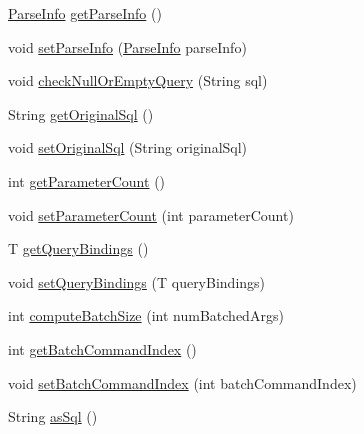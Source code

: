 \begin{DoxyCompactItemize}
\item 
\mbox{\hyperlink{classcom_1_1mysql_1_1cj_1_1_parse_info}{Parse\+Info}} \mbox{\hyperlink{interfacecom_1_1mysql_1_1cj_1_1_prepared_query_a4c05f98057039c47c3866f4113bd2d4e}{get\+Parse\+Info}} ()
\item 
void \mbox{\hyperlink{interfacecom_1_1mysql_1_1cj_1_1_prepared_query_a616abdbbf0bf436a8324917bbef4078d}{set\+Parse\+Info}} (\mbox{\hyperlink{classcom_1_1mysql_1_1cj_1_1_parse_info}{Parse\+Info}} parse\+Info)
\item 
void \mbox{\hyperlink{interfacecom_1_1mysql_1_1cj_1_1_prepared_query_a3d5c1f7649b3caecdfd05e6161d55ee8}{check\+Null\+Or\+Empty\+Query}} (String sql)
\item 
String \mbox{\hyperlink{interfacecom_1_1mysql_1_1cj_1_1_prepared_query_a15a2071e71800462de4e0e82b7e71af2}{get\+Original\+Sql}} ()
\item 
void \mbox{\hyperlink{interfacecom_1_1mysql_1_1cj_1_1_prepared_query_ae44f0bc2ecc43451a553b7681f5e2203}{set\+Original\+Sql}} (String original\+Sql)
\item 
int \mbox{\hyperlink{interfacecom_1_1mysql_1_1cj_1_1_prepared_query_af1cfb6147da91d2a8a661e52be4f6f55}{get\+Parameter\+Count}} ()
\item 
void \mbox{\hyperlink{interfacecom_1_1mysql_1_1cj_1_1_prepared_query_adec66658c5ac61ba9e016651bdfb16a5}{set\+Parameter\+Count}} (int parameter\+Count)
\item 
T \mbox{\hyperlink{interfacecom_1_1mysql_1_1cj_1_1_prepared_query_a437189199c669b86be0b4407e6d44d5d}{get\+Query\+Bindings}} ()
\item 
void \mbox{\hyperlink{interfacecom_1_1mysql_1_1cj_1_1_prepared_query_aefa0302ef70356926e5a31142dc0fd19}{set\+Query\+Bindings}} (T query\+Bindings)
\item 
int \mbox{\hyperlink{interfacecom_1_1mysql_1_1cj_1_1_prepared_query_a2f8a64855253f9a463c37617651d8efd}{compute\+Batch\+Size}} (int num\+Batched\+Args)
\item 
int \mbox{\hyperlink{interfacecom_1_1mysql_1_1cj_1_1_prepared_query_a6259e5fb4022b601291d1761d8989b28}{get\+Batch\+Command\+Index}} ()
\item 
void \mbox{\hyperlink{interfacecom_1_1mysql_1_1cj_1_1_prepared_query_accf6ed5e5f4c11b08004265529ea0975}{set\+Batch\+Command\+Index}} (int batch\+Command\+Index)
\item 
String \mbox{\hyperlink{interfacecom_1_1mysql_1_1cj_1_1_prepared_query_ac2538d056fb63b9b41286a424bb712c1}{as\+Sql}} ()

\end{DoxyCompactItemize}
